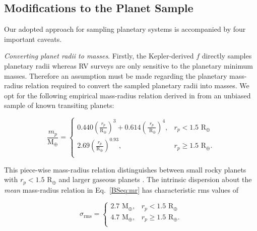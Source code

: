 \subsection{Modifications to the Planet Sample} \label{BSsect:dynam}
Our adopted approach for sampling planetary systems is accompanied by four important caveats.

\emph{Converting planet radii to masses}. Firstly, the Kepler-derived $f$ directly samples
planetary radii whereas RV surveys are only sensitive to the planetary minimum
masses. Therefore an assumption must be made regarding the 
planetary mass-radius relation required to convert the sampled planetary radii into masses.
We opt for the following empirical mass-radius relation derived in \cite{weiss14} from an unbiased
sample of known transiting planets:

\begin{equation}
  \frac{m_p}{\text{M}_{\oplus}} =
  \begin{cases}
    0.440 \left( \frac{r_p}{\text{R}_{\oplus}} \right)^3 + 0.614 \left( \frac{r_p}{\text{ R}_{\oplus}} \right)^4, &
    r_p < 1.5 \text{ R}_{\oplus} \\
    2.69 \left( \frac{r_p}{\text{R}_{\oplus}} \right)^{0.93}, & r_p \ge 1.5 \text{ R}_{\oplus}. \\
  \end{cases}
 \label{BSeq:mr}
\end{equation}

\noindent This piece-wise mass-radius relation distinguishes between small rocky planets with
$r_p < 1.5$ R$_{\oplus}$ and larger gaseous planets \citep[e.g.][]{rogers15, dressing15b, fulton17}. The
intrinsic dispersion about the \emph{mean} mass-radius relation in Eq.~\ref{BSeq:mr} has characteristic
rms values of

\begin{equation}
  \sigma_{\text{rms}} =
  \begin{cases}
    2.7 \text{ M}_{\oplus}, & r_p < 1.5 \text{ R}_{\oplus} \\
    4.7 \text{ M}_{\oplus}, & r_p \ge 1.5 \text{ R}_{\oplus}. \\
  \end{cases}
  \label{BSeq:mrscat}
\end{equation}

